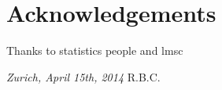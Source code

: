 \chapter*{Acknowledgements}

Thanks to statistics people and lmsc
\lipsum[12]

\bigskip
 
\noindent\textit{Zurich, April 15th, 2014}
\hfill R.B.C.

